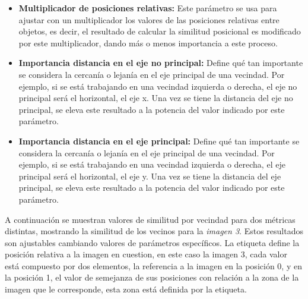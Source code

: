 \begin{itemize}
    \item \textbf{Multiplicador de posiciones relativas:} Este parámetro se usa para ajustar con un multiplicador los valores de las posiciones relativas entre objetos, es decir, el resultado de calcular la similitud posicional es modificado por este multiplicador, dando m\'as o menos importancia a este proceso. 

    \item \textbf{Importancia distancia en el eje no principal:} Define qué tan importante se considera la cercanía o lejanía en el eje principal de una vecindad. Por ejemplo, si se est\'a trabajando en una vecindad izquierda o derecha, el eje no principal será el horizontal, el eje x. Una vez se tiene la distancia del eje no principal, se eleva este resultado a la potencia del valor indicado por este par\'ametro.

    \item \textbf{Importancia distancia en el eje principal:} Define qué tan importante se considera la cercanía o lejanía en el eje principal de una vecindad. Por ejemplo, si se est\'a trabajando en una vecindad izquierda o derecha, el eje principal será el horizontal, el eje y. Una vez se tiene la distancia del eje principal, se eleva este resultado a la potencia del valor indicado por este par\'ametro.
\end{itemize}

A continuación se muestran valores de similitud por vecindad para dos métricas distintas, mostrando la similitud de los vecinos para la \textit{imagen 3}. Estos resultados son ajustables cambiando valores de parámetros espec\'ificos. La etiqueta define la posición relativa a la imagen en cuestion, en este caso la imagen 3, cada valor está compuesto por dos elementos, la referencia a la imagen en la posici\'on 0, y en la posici\'on 1, el valor de semejanza de sus posiciones con relación a la zona de la imagen que le corresponde, esta zona est\'a definida por la etiqueta.

